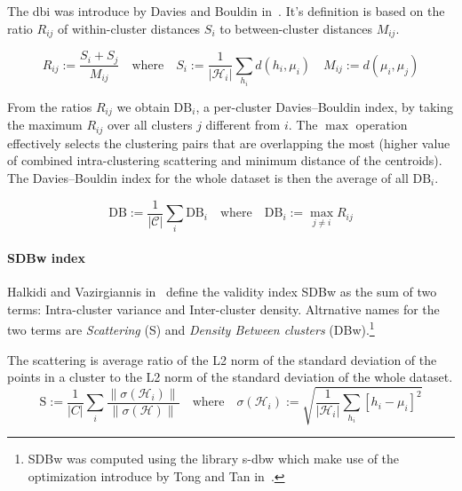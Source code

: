 The \acrfull{dbi} was introduce by Davies and Bouldin in~. It's definition is based on the ratio $R_{ij}$ of within-cluster distances $S_i$ to between-cluster distances $M_{ij}$.

\begin{equation*}
  R_{ij} := \frac{S_i + S_j}{M_{ij}}
  \quad \textrm{where} \quad
  S_i := \frac{1}{|\mathcal{H}_i|} \sum_{h_i} d(h_i, \mu_i) \quad
  M_{ij} := d(\mu_i, \mu_j)
\end{equation*}

From the ratios $R_{ij}$ we obtain $\textrm{DB}_i$, a per-cluster Davies–Bouldin index, by taking the maximum $R_{ij}$ over all clusters $j$ different from $i$. The $\max$ operation effectively selects the clustering pairs that are overlapping the most (higher value of combined intra-clustering scattering and minimum distance of the centroids). The Davies–Bouldin index for the whole dataset is then the average of all $\textrm{DB}_i$.

\begin{equation}
  \textrm{DB} := \frac{1}{|\mathcal{C}|} \sum_{i} \textrm{DB}_i
  \quad \textrm{where} \quad
  \textrm{DB}_i := \max_{j \neq i} R_{ij}
  \label{eq:bdi}
\end{equation}

\paragraph{SDBw index}
\label{par:sdbw}

Halkidi and Vazirgiannis in~\cite{ClusteringValiHalkid} define the validity index SDBw as the sum of two terms: Intra-cluster variance and Inter-cluster density. Altrnative names for the two terms are \emph{Scattering} (S) and \emph{Density Between clusters} (DBw).\footnote{SDBw was computed using the library s-dbw\cite{SDbwLashko2019} which make use of the optimization introduce by Tong and Tan in~\cite{ClusteringValiTong2009}.}

The scattering is average ratio of the L2 norm of the standard deviation of the points in a cluster to the L2 norm of the standard deviation of the whole dataset.
\begin{equation*}
  \textrm{S} := \frac{1}{|C|} \sum_{i} \frac{\|\sigma(\mathcal{H}_i)\|}{\|\sigma(\mathcal{H})\|}
  \quad \textrm{where} \quad
  \sigma(\mathcal{H}_i) := \sqrt{\frac{1}{|\mathcal{H}_i|} \sum_{h_i} \left[h_i - \mu_i \right]^{2}}
\end{equation*}

